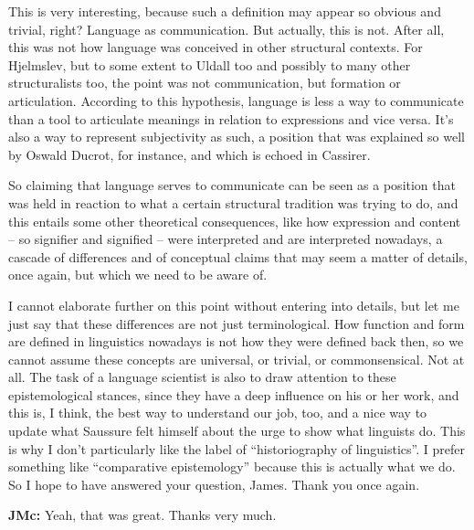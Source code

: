 \begin{styleStandard}
This is very interesting, because such a definition may appear so obvious and trivial, right? Language as communication. But actually, this is not. After all, this was not how language was conceived in other structural contexts. For Hjelmslev, but to some extent to Uldall too and possibly to many other structuralists too, the point was not communication, but formation or articulation. According to this hypothesis, language is less a way to communicate than a tool to articulate meanings in relation to expressions and vice versa. It’s also a way to represent subjectivity as such, a position that was explained so well by Oswald Ducrot, for instance, and which is echoed in Cassirer.
\end{styleStandard}

\begin{styleStandard}
So claiming that language serves to communicate can be seen as a position that was held in reaction to what a certain structural tradition was trying to do, and this entails some other theoretical consequences, like how expression and content – so signifier and signified – were interpreted and are interpreted nowadays, a cascade of differences and of conceptual claims that may seem a matter of details, once again, but which we need to be aware of. 
\end{styleStandard}

\begin{styleStandard}
I cannot elaborate further on this point without entering into details, but let me just say that these differences are not just terminological. How function and form are defined in linguistics nowadays is not how they were defined back then, so we cannot assume these concepts are universal, or trivial, or commonsensical. Not at all. The task of a language scientist is also to draw attention to these epistemological stances, since they have a deep influence on his or her work, and this is, I think, the best way to understand our job, too, and a nice way to update what Saussure felt himself about the urge to show what linguists do. This is why I don’t particularly like the label of “historiography of linguistics”. I prefer something like “comparative epistemology” because this is actually what we do. So I hope to have answered your question, James. Thank you once again.
\end{styleStandard}

\begin{styleStandard}
\textbf{JMc:} Yeah, that was great. Thanks very much.
\end{styleStandard}

